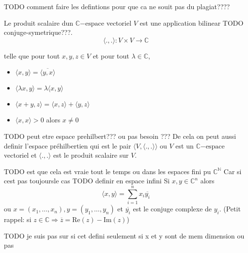 TODO comment faire les defintions pour que ca ne souit pas du plagiat????
\begin{definition}[$l^2$]
    
\end{definition}

\begin{definition}
    Le produit scalaire dun $\mathbb{C}\mathrm{-espace}$ vectoriel $V$ est une application bilinear TODO conjuge-symetrique???. $$\langle ., . \rangle : V \times V \rightarrow \mathbb{C}$$

    telle que pour tout $x, y, z\in V$ et pour tout $\lambda \in \mathbb{C}$,
    \begin{itemize}
        \item $\langle x, y \rangle = \overline{\langle y,x \rangle}$
        \item $\langle \lambda x, y \rangle = \lambda\langle x,y \rangle$
        \item $\langle x+y, z \rangle = \langle x,z \rangle + \langle y,z \rangle$
        \item $\langle x,x \rangle > 0 $ alors $x \neq 0 $
    \end{itemize}
    
    TODO peut etre espace prehilbert??? ou pas besoin ???
    De cela on peut aussi definir l'espace préhilbertien qui est le pair $\langle V, \langle.,.\rangle \rangle$ ou $V$ est un $\mathbb{C}\mathrm{-espace}$ vectoriel et $\langle.,.\rangle$ est le produit scalaire sur $V$.
\end{definition}

TODO est que cela est vraie tout le temps ou dans les espaces fini pu $\mathbb{C}^\mathbb{N}$ Car si cest pas toujoursle cas TODO definir en espace infini
Si $x, y \in \mathbb{C}^n $  alors
$$\langle x,y \rangle = \sum_{i=1}^{n} x_i \overline{y_i}$$
ou $x = (x_1, \ldots, x_n), y = (y_1, \ldots, y_n)$ et $\overline{y_i}$ est le conjuge complexe de $y_i$.  \newline (Petit rappel: si $z \in \mathbb{C} \Rightarrow \overline{z} = \mathrm{Re}(z) - \mathrm{Im}(z) $)

TODO je suis pas sur si cet defini seulement si x et y sont de mem dimension ou pas 
\begin{definition}
    
\end{definition}



\begin{definition}

\end{definition}
